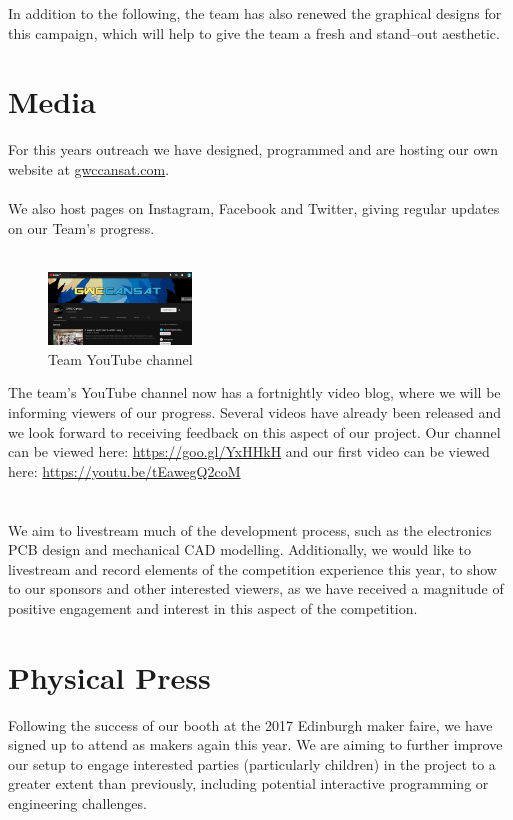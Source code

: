 \documentclass{report}
\begin{document}
	In addition to the following, the team has also renewed the graphical designs
	for this campaign, which will help to give the team a fresh and stand--out
	aesthetic.
	
		
	\section{Media}
		For this years outreach we have designed, programmed and are hosting our
		own website at \url{gwccansat.com}.\\\\
		We also host pages on Instagram, Facebook and Twitter, giving regular
		updates	on our Team's progress.\\\\

		\begin{figure}
			\vspace{-30pt}
	 		\begin{center}
			\includegraphics[width=0.34\textwidth]{youtube}
			\end{center}
			\vspace{-15pt}
			\caption[X]{Team YouTube channel}
		\end{figure}

		\noindent
		The team's YouTube channel now has a fortnightly video blog, where we
		will be informing viewers of our progress. Several videos have already been
		released and we look forward to receiving feedback on this aspect of our
		project. Our channel can be viewed here: \url{https://goo.gl/YxHHkH} and 
		our first video can be viewed here: \url{https://youtu.be/tEawegQ2coM}\\\\\\
		We aim to livestream much of the development process, such 
		as the electronics PCB design and mechanical CAD modelling. Additionally, we
		would like to livestream and record elements of the competition experience
		this year, to show to our sponsors and other interested viewers, as we
		have received a magnitude of positive engagement and interest in this 
		aspect of the competition.
	
	\section{Physical Press}
		Following the success of our booth at the 2017 Edinburgh maker faire, we
		have signed up to attend as makers again this year. We are aiming to
		further improve our setup to engage interested parties (particularly children)
		in the 
		project to a greater extent than previously, including potential interactive
		programming or engineering challenges.\\\\
		\clearpage
\end{document}
